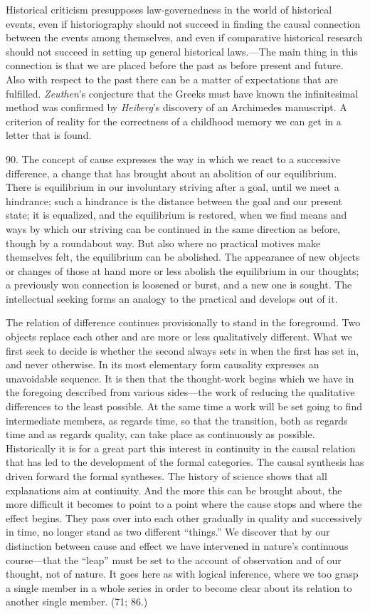 \documentclass[12pt,a4paper]{book}
\newcommand{\opage}[1]{\marginnote{\footnotesize\textit{[#1]}}}
\begin{document}
Historical criticism presupposes law-governedness in the world of historical
events, even if historiography should not succeed in finding the causal
connection between the events among themselves, and even if comparative
historical research should not succeed in setting up general historical
laws.---The main thing in this connection is that we are placed before the
past as before present and future. Also with respect to the past there can be
a matter of expectations that are fulfilled. \emph{Zeuthen}'s conjecture that
the Greeks must have known the infinitesimal method was confirmed by
\emph{Heiberg}'s discovery of an Archimedes manuscript. A criterion of reality
for the correctness of a childhood memory we can get in a letter that is
found.

90. The concept of cause expresses the way in which we react to a successive
difference, a change that has brought about an abolition of our equilibrium.
There is equilibrium in our involuntary striving after a goal, until we meet a
hindrance; such a hindrance is the distance between the goal and our present
state; it is equalized, and the equilibrium is restored, when we find means
and ways by which our striving can be continued in the same direction as
before, though by a roundabout way. But also where no practical \opage{212}motives make
themselves felt, the equilibrium can be abolished. The appearance of new
objects or changes of those at hand more or less abolish the equilibrium in
our thoughts; a previously won connection is loosened or burst, and a new one
is sought. The intellectual seeking forms an analogy to the practical and
develops out of it.

The relation of difference continues provisionally to stand in the
foreground. Two objects replace each other and are more or less qualitatively
different. What we first seek to decide is whether the second always sets in
when the first has set in, and never otherwise. In its most elementary form
causality expresses an unavoidable sequence. It is then that the thought-work
begins which we have in the foregoing described from various sides---the work
of reducing the qualitative differences to the least possible. At the same
time a work will be set going to find intermediate members, as regards time,
so that the transition, both as regards time and as regards quality, can take
place as continuously as possible. Historically it is for a great part this
interest in continuity in the causal relation that has led to the development
of the formal categories. The causal synthesis has driven forward the formal
syntheses. The history of science shows that all explanations aim at
continuity. And the more this can be brought about, the more difficult it
becomes to point to a point where the cause stops and where the effect begins.
They pass over into each other gradually in quality and successively in time,
no longer stand as two different ``things.'' We discover that by our
distinction between cause and effect we have intervened in nature's continuous
course---that the ``leap'' must be set to the account of observation and of
our thought, not of nature. It goes here as with logical inference, where we
too grasp a single member in a whole series in order to become clear about its
relation to another single member. (71; 86.)
\end{document}

